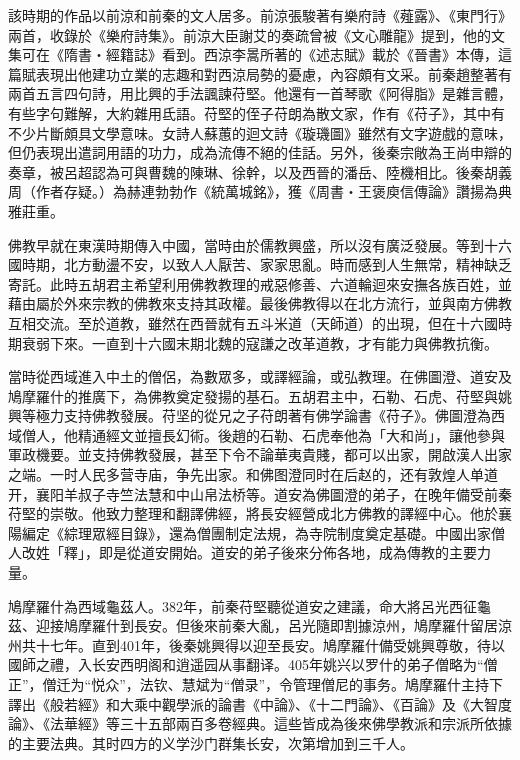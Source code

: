 該時期的作品以前涼和前秦的文人居多。前涼張駿著有樂府詩《薤露》、《東門行》兩首，收錄於《樂府詩集》。前涼大臣謝艾的奏疏曾被《文心雕龍》提到，他的文集可在《隋書‧經籍誌》看到。西涼李暠所著的《述志賦》載於《晉書》本傳，這篇賦表現出他建功立業的志趣和對西涼局勢的憂慮，內容頗有文采。前秦趙整著有兩首五言四句詩，用比興的手法諷諫苻堅。他還有一首琴歌《阿得脂》是雜言體，有些字句難解，大約雜用氐語。苻堅的侄子苻朗為散文家，作有《苻子》，其中有不少片斷頗具文學意味。女詩人蘇蕙的迴文詩《璇璣圖》雖然有文字遊戲的意味，但仍表現出遣詞用語的功力，成為流傳不絕的佳話。另外，後秦宗敞為王尚申辯的奏章，被呂超認為可與曹魏的陳琳、徐幹，以及西晉的潘岳、陸機相比。後秦胡義周（作者存疑。）為赫連勃勃作《統萬城銘》，獲《周書‧王褒庾信傳論》讚揚為典雅莊重。

佛教早就在東漢時期傳入中國，當時由於儒教興盛，所以沒有廣泛發展。等到十六國時期，北方動盪不安，以致人人厭苦、家家思亂。時而感到人生無常，精神缺乏寄託。此時五胡君主希望利用佛教教理的戒惡修善、六道輪迴來安撫各族百姓，並藉由屬於外來宗教的佛教來支持其政權。最後佛教得以在北方流行，並與南方佛教互相交流。至於道教，雖然在西晉就有五斗米道（天師道）的出現，但在十六國時期衰弱下來。一直到十六國末期北魏的寇謙之改革道教，才有能力與佛教抗衡。

當時從西域進入中土的僧侶，為數眾多，或譯經論，或弘教理。在佛圖澄、道安及鳩摩羅什的推廣下，為佛教奠定發揚的基石。五胡君主中，石勒、石虎、苻堅與姚興等極力支持佛教發展。苻坚的從兄之子苻朗著有佛学論書《苻子》。佛圖澄為西域僧人，他精通經文並擅長幻術。後趙的石勒、石虎奉他為「大和尚」，讓他參與軍政機要。並支持佛教發展，甚至下令不論華夷貴賤，都可以出家，開啟漢人出家之端。一时人民多营寺庙，争先出家。和佛图澄同时在后赵的，还有敦煌人单道开，襄阳羊叔子寺竺法慧和中山帛法桥等。道安為佛圖澄的弟子，在晚年備受前秦苻堅的崇敬。他致力整理和翻譯佛經，將長安經營成北方佛教的譯經中心。他於襄陽編定《綜理眾經目錄》，還為僧團制定法規，為寺院制度奠定基礎。中國出家僧人改姓「釋」，即是從道安開始。道安的弟子後來分佈各地，成為傳教的主要力量。

鳩摩羅什為西域龜茲人。382年，前秦苻堅聽從道安之建議，命大將呂光西征龜茲、迎接鳩摩羅什到長安。但後來前秦大亂，呂光隨即割據涼州，鳩摩羅什留居涼州共十七年。直到401年，後秦姚興得以迎至長安。鳩摩羅什備受姚興尊敬，待以國師之禮，入长安西明阁和逍遥园从事翻译。405年姚兴以罗什的弟子僧略为“僧正”，僧迁为“悦众”，法钦、慧斌为“僧录”，令管理僧尼的事务。鳩摩羅什主持下譯出《般若經》和大乘中觀學派的論書《中論》、《十二門論》、《百論》及《大智度論》、《法華經》等三十五部兩百多卷經典。這些皆成為後來佛學教派和宗派所依據的主要法典。其时四方的义学沙门群集长安，次第增加到三千人。

